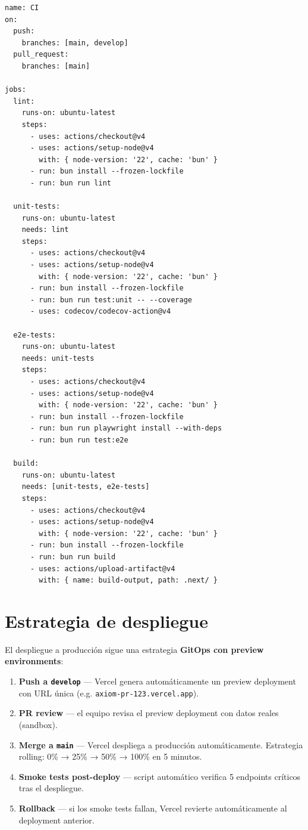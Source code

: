 \documentclass[10pt,a4paper,oneside]{report}
\begin{document}
\begin{lstlisting}[style=bash,caption={Pipeline CI/CD en GitHub Actions}]
name: CI
on:
  push:
    branches: [main, develop]
  pull_request:
    branches: [main]

jobs:
  lint:
    runs-on: ubuntu-latest
    steps:
      - uses: actions/checkout@v4
      - uses: actions/setup-node@v4
        with: { node-version: '22', cache: 'bun' }
      - run: bun install --frozen-lockfile
      - run: bun run lint

  unit-tests:
    runs-on: ubuntu-latest
    needs: lint
    steps:
      - uses: actions/checkout@v4
      - uses: actions/setup-node@v4
        with: { node-version: '22', cache: 'bun' }
      - run: bun install --frozen-lockfile
      - run: bun run test:unit -- --coverage
      - uses: codecov/codecov-action@v4

  e2e-tests:
    runs-on: ubuntu-latest
    needs: unit-tests
    steps:
      - uses: actions/checkout@v4
      - uses: actions/setup-node@v4
        with: { node-version: '22', cache: 'bun' }
      - run: bun install --frozen-lockfile
      - run: bun run playwright install --with-deps
      - run: bun run test:e2e

  build:
    runs-on: ubuntu-latest
    needs: [unit-tests, e2e-tests]
    steps:
      - uses: actions/checkout@v4
      - uses: actions/setup-node@v4
        with: { node-version: '22', cache: 'bun' }
      - run: bun install --frozen-lockfile
      - run: bun run build
      - uses: actions/upload-artifact@v4
        with: { name: build-output, path: .next/ }
\end{lstlisting}

\section{Estrategia de despliegue}
El despliegue a producción sigue una estrategia \textbf{GitOps con preview environments}:

\begin{enumerate}[leftmargin=1.6em]
\item \textbf{Push a \texttt{develop}} — Vercel genera automáticamente un preview deployment con URL única (e.g. \texttt{axiom-pr-123.vercel.app}).
\item \textbf{PR review} — el equipo revisa el preview deployment con datos reales (sandbox).
\item \textbf{Merge a \texttt{main}} — Vercel despliega a producción automáticamente. Estrategia rolling: 0\% → 25\% → 50\% → 100\% en 5 minutos.
\item \textbf{Smoke tests post-deploy} — script automático verifica 5 endpoints críticos tras el despliegue.
\item \textbf{Rollback} — si los smoke tests fallan, Vercel revierte automáticamente al deployment anterior.
\end{enumerate}
\end{document}
